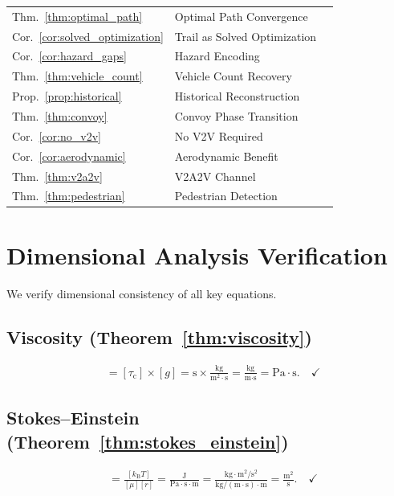 \documentclass[11pt,twocolumn,a4paper]{article}
\theoremstyle{plain}
\theoremstyle{definition}
\theoremstyle{remark}
\newcommand{\kB}{k_{\mathrm{B}}}
\newcommand{\tauc}{\tau_{\mathrm{c}}}
\begin{document}
\begin{longtable}{lll}
Thm.~\ref{thm:optimal_path} & Optimal Path Convergence & \pageref{thm:optimal_path} \\
Cor.~\ref{cor:solved_optimization} & Trail as Solved Optimization & \pageref{cor:solved_optimization} \\
Cor.~\ref{cor:hazard_gaps} & Hazard Encoding & \pageref{cor:hazard_gaps} \\
Thm.~\ref{thm:vehicle_count} & Vehicle Count Recovery & \pageref{thm:vehicle_count} \\
Prop.~\ref{prop:historical} & Historical Reconstruction & \pageref{prop:historical} \\
Thm.~\ref{thm:convoy} & Convoy Phase Transition & \pageref{thm:convoy} \\
Cor.~\ref{cor:no_v2v} & No V2V Required & \pageref{cor:no_v2v} \\
Cor.~\ref{cor:aerodynamic} & Aerodynamic Benefit & \pageref{cor:aerodynamic} \\
Thm.~\ref{thm:v2a2v} & V2A2V Channel & \pageref{thm:v2a2v} \\
Thm.~\ref{thm:pedestrian} & Pedestrian Detection & \pageref{thm:pedestrian} \\
\bottomrule
\end{longtable}


\section{Dimensional Analysis Verification}
\label{app:dimensions}

We verify dimensional consistency of all key equations.

\subsection{Viscosity (Theorem~\ref{thm:viscosity})}
\begin{align}
[\mu] &= [\tauc] \times [g] = \text{s} \times \frac{\text{kg}}{\text{m}^2 \cdot \text{s}} = \frac{\text{kg}}{\text{m} \cdot \text{s}} = \text{Pa} \cdot \text{s}. \quad\checkmark
\end{align}

\subsection{Stokes--Einstein (Theorem~\ref{thm:stokes_einstein})}
\begin{align}
[D] &= \frac{[\kB T]}{[\mu][r]} = \frac{\text{J}}{\text{Pa}\cdot\text{s}\cdot\text{m}} = \frac{\text{kg}\cdot\text{m}^2/\text{s}^2}{\text{kg}/(\text{m}\cdot\text{s})\cdot\text{m}} = \frac{\text{m}^2}{\text{s}}. \quad\checkmark
\end{align}
\end{document}
